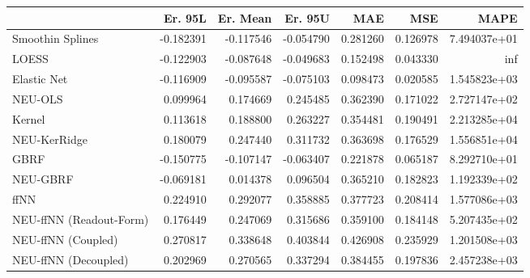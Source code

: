 \begin{tabular}{lrrrrrr}
\toprule
{} &   Er. 95L &  Er. Mean &   Er. 95U &       MAE &       MSE &          MAPE \\
\midrule
Smoothin Splines        & -0.182391 & -0.117546 & -0.054790 &  0.281260 &  0.126978 &  7.494037e+01 \\
LOESS                   & -0.122903 & -0.087648 & -0.049683 &  0.152498 &  0.043330 &           inf \\
Elastic Net             & -0.116909 & -0.095587 & -0.075103 &  0.098473 &  0.020585 &  1.545823e+03 \\
NEU-OLS                 &  0.099964 &  0.174669 &  0.245485 &  0.362390 &  0.171022 &  2.727147e+02 \\
Kernel                  &  0.113618 &  0.188800 &  0.263227 &  0.354481 &  0.190491 &  2.213285e+04 \\
NEU-KerRidge            &  0.180079 &  0.247440 &  0.311732 &  0.363698 &  0.176529 &  1.556851e+04 \\
GBRF                    & -0.150775 & -0.107147 & -0.063407 &  0.221878 &  0.065187 &  8.292710e+01 \\
NEU-GBRF                & -0.069181 &  0.014378 &  0.096504 &  0.365210 &  0.182823 &  1.192339e+02 \\
ffNN                    &  0.224910 &  0.292077 &  0.358885 &  0.377723 &  0.208414 &  1.577086e+03 \\
NEU-ffNN (Readout-Form) &  0.176449 &  0.247069 &  0.315686 &  0.359100 &  0.184148 &  5.207435e+02 \\
NEU-ffNN (Coupled)      &  0.270817 &  0.338648 &  0.403844 &  0.426908 &  0.235929 &  1.201508e+03 \\
NEU-ffNN (Decoupled)    &  0.202969 &  0.270565 &  0.337294 &  0.384455 &  0.197836 &  2.457238e+03 \\
\bottomrule
\end{tabular}
